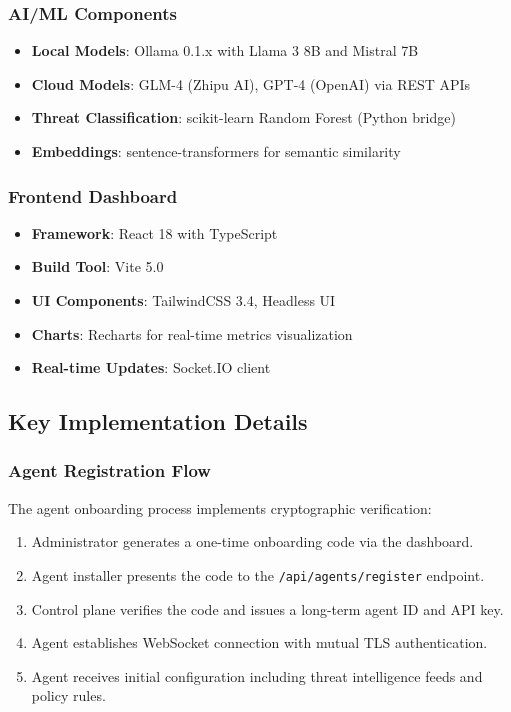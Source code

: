 \subsubsection{AI/ML Components}

\begin{itemize}
    \item \textbf{Local Models}: Ollama 0.1.x with Llama 3 8B and Mistral 7B
    \item \textbf{Cloud Models}: GLM-4 (Zhipu AI), GPT-4 (OpenAI) via REST APIs
    \item \textbf{Threat Classification}: scikit-learn Random Forest (Python bridge)
    \item \textbf{Embeddings}: sentence-transformers for semantic similarity
\end{itemize}

\subsubsection{Frontend Dashboard}

\begin{itemize}
    \item \textbf{Framework}: React 18 with TypeScript
    \item \textbf{Build Tool}: Vite 5.0
    \item \textbf{UI Components}: TailwindCSS 3.4, Headless UI
    \item \textbf{Charts}: Recharts for real-time metrics visualization
    \item \textbf{Real-time Updates}: Socket.IO client
\end{itemize}

\subsection{Key Implementation Details}
\label{subsec:implementation-details}

\subsubsection{Agent Registration Flow}

The agent onboarding process implements cryptographic verification:

\begin{enumerate}
    \item Administrator generates a one-time onboarding code via the dashboard.
    \item Agent installer presents the code to the \texttt{/api/agents/register} endpoint.
    \item Control plane verifies the code and issues a long-term agent ID and API key.
    \item Agent establishes WebSocket connection with mutual TLS authentication.
    \item Agent receives initial configuration including threat intelligence feeds and policy rules.
\end{enumerate}


